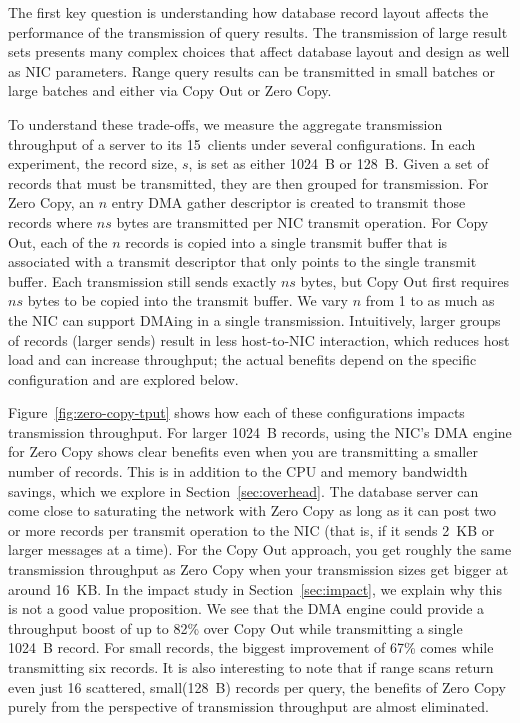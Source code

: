 The first key question is understanding how database record layout affects the
performance of the transmission of query results.  The transmission of large
result sets presents many complex choices that affect
database layout and design as well as NIC parameters.  Range query
results can be transmitted in small batches or large batches and either via
Copy Out or Zero Copy.

To understand these trade-offs, we measure the aggregate transmission
throughput of a server to its 15~clients under several
configurations.  In each experiment, the record size, $s$, is set as either 1024~B or
128~B. Given a set of records that must be transmitted, they are then grouped
for transmission. For Zero Copy, an $n$ entry DMA gather descriptor is created
to transmit those records where $ns$ bytes are transmitted per NIC transmit
operation. For Copy Out, each of the $n$ records is copied into a single
transmit buffer that is associated with a transmit descriptor that only points
to the single transmit buffer. Each transmission still sends exactly $ns$
bytes, but Copy Out first requires $ns$ bytes to be copied into the transmit buffer.
We vary $n$ from 1 to as much as the NIC can support DMAing in a single transmission.
Intuitively, larger groups of records (larger sends) result in less host-to-NIC
interaction, which reduces host load and can increase throughput; the actual benefits
depend on the specific configuration and are explored below.

Figure~\ref{fig:zero-copy-tput} shows how each of these configurations impacts
transmission throughput. For larger 1024~B records, using the NIC's DMA engine
for Zero Copy shows clear benefits even when you are transmitting a smaller number of 
records. This is in addition to the CPU and memory bandwidth savings, which 
we explore in Section~\ref{sec:overhead}. The database server can come close to
saturating the network with Zero Copy as long as it can post two or more
records per transmit operation to the NIC (that is, if it sends 2~KB or larger
messages at a time). For the Copy Out approach, you get roughly the same transmission 
throughput as Zero Copy when your transmission sizes get bigger at around 16~KB. In 
the impact study in Section~\ref{sec:impact}, we explain why this is not a good value 
proposition. We see that the DMA engine could provide a throughput boost
of up to 82\% over Copy Out while transmitting a single 1024~B record. For small 
records, the biggest improvement of 67\% comes while transmitting six records. It is also interesting 
to note that if range scans return even just 16 scattered, small(128~B) records per query, the
benefits of Zero Copy purely from the perspective of transmission throughput are almost eliminated.

